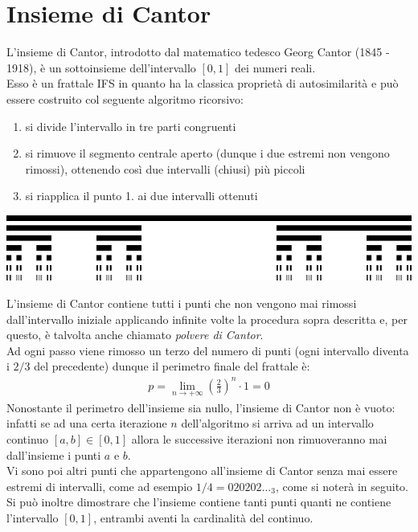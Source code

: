 \documentclass[10pt]{report}
\begin{document}
		\section{Insieme di Cantor}
			L'insieme di Cantor, introdotto dal matematico tedesco Georg Cantor (1845 - 1918), è un sottoinsieme dell'intervallo $[0, 1]$ dei numeri reali.\\
			Esso è un frattale IFS in quanto ha la classica proprietà di autosimilarità e può essere costruito col seguente algoritmo ricorsivo:
			\begin{enumerate}
				\item si divide l'intervallo in tre parti congruenti
				\item si rimuove il segmento centrale aperto (dunque i due estremi non vengono rimossi), ottenendo così due intervalli (chiusi) più piccoli
				\item si riapplica il punto 1. ai due intervalli ottenuti
			\end{enumerate}
			\begin{center}
				\includegraphics[width=0.7\linewidth]{"Insieme di Cantor/cantor_set_in_seven_iterations"}
			\end{center}
			L'insieme di Cantor contiene tutti i punti che non vengono mai rimossi dall'intervallo iniziale applicando infinite volte la procedura sopra descritta e, per questo, è talvolta anche chiamato \textit{polvere di Cantor}.\\
			Ad ogni passo viene rimosso un terzo del numero di punti (ogni intervallo diventa i $2/3$ del precedente) dunque il perimetro finale del frattale è:
			\begin{gather*}
				p = \lim_{n \to +\infty} \left( \frac{2}{3} \right) ^ n \cdot 1 = 0
			\end{gather*}
			Nonostante il perimetro dell'insieme sia nullo, l'insieme di Cantor non è vuoto: infatti se ad una certa iterazione $n$ dell'algoritmo si arriva ad un intervallo continuo $[a, b] \in [0, 1]$ allora le successive iterazioni non rimuoveranno mai dall'insieme i punti $a$ e $b$.\\
			Vi sono poi altri punti che appartengono all'insieme di Cantor senza mai essere estremi di intervalli, come ad esempio $1/4 = 020202..._3$, come si noterà in seguito.\\
			Si può inoltre dimostrare che l'insieme contiene tanti punti quanti ne contiene l'intervallo $[0, 1]$, entrambi aventi la cardinalità del continuo.
\end{document}
